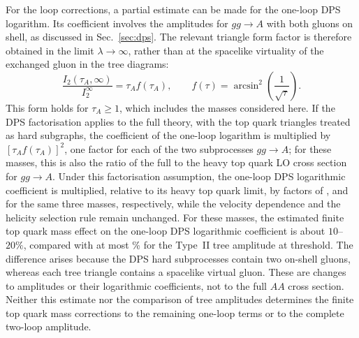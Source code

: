 For the loop corrections, a partial estimate can
be made for the one-loop DPS logarithm. Its
coefficient involves the amplitudes for
$gg\to A$ with both gluons on shell, as discussed
in Sec.~\ref{sec:dps}. The relevant triangle form
factor is therefore obtained in the limit
$\lambda\to\infty$, rather than at the spacelike
virtuality of the exchanged gluon in the tree
diagrams:
\begin{equation}
 \frac{I_2(\tau_A,\infty)}{I_2^\infty}
 =\tau_A f(\tau_A),
 \qquad
 f(\tau)=\arcsin^2\!\left(\frac{1}{\sqrt{\tau}}\right).
 \label{eq:top-dps}
\end{equation}
This form holds for $\tau_A\geq1$, which includes the masses considered here. If the DPS factorisation applies to the full
theory, with the top quark triangles treated as
hard subgraphs, the coefficient of the one-loop
logarithm is multiplied by $[\tau_A f(\tau_A)]^2$,
one factor for each of the two subprocesses $gg\to A$;
for these masses, this is also the ratio of the full to the heavy top quark LO cross section for $gg\to A$.
Under this factorisation assumption, the one-loop DPS
logarithmic coefficient is multiplied, relative to its heavy
top quark limit, by factors of \TopMassDPSA, \TopMassDPSB{} and
\TopMassDPSC{} for the same three masses, respectively, while the velocity dependence and the helicity selection rule remain unchanged.
For these masses, the estimated finite top quark mass effect on
the one-loop DPS logarithmic coefficient is about $10$--$20\%$,
compared with at most \TopMassPercentMax\% for the Type~II tree
amplitude at threshold. The difference arises because the DPS
hard subprocesses contain two on-shell gluons, whereas each
tree triangle contains a spacelike virtual gluon.
These are changes to amplitudes or their logarithmic
coefficients, not to the full $AA$ cross section.
Neither this estimate nor the comparison of
tree amplitudes determines the finite top
quark mass corrections to the remaining
one-loop terms or to the complete two-loop
amplitude.
